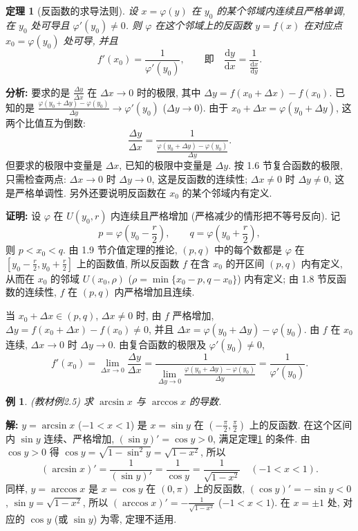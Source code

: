 \documentclass[UTF8,openany]{ctexbook}
\theoremstyle{chinesetextbook}
\newtheorem{example}{例}[section]
\newtheorem{theorem}{定理}[section]
\newenvironment{cnproof}{\par\indent\textbf{证明:} \ignorespaces}{\par}
\newenvironment{cnsolution}{\par\indent\textbf{解:} \ignorespaces}{\par}
\newcommand{\dd}{\mathrm d}
\begin{document}
\begin{theorem}[反函数的求导法则]\label{thm:c2-2-inv}
设 $x=\varphi(y)$ 在 $y_0$ 的某个邻域内连续且严格单调, 在 $y_0$ 处可导且 $\varphi'(y_0)\ne0$. 则 $\varphi$ 在这个邻域上的反函数 $y=f(x)$ 在对应点 $x_0=\varphi(y_0)$ 处可导, 并且
\[
f'(x_0)=\frac1{\varphi'(y_0)},\qquad\text{即}\quad\frac{\dd y}{\dd x}=\frac1{\displaystyle\frac{\dd x}{\dd y}}.
\]
\end{theorem}
\par\indent\textbf{分析:} 要求的是 $\displaystyle\frac{\Delta y}{\Delta x}$ 在 $\Delta x\to0$ 时的极限, 其中 $\Delta y=f(x_0+\Delta x)-f(x_0)$. 已知的是 $\displaystyle\frac{\varphi(y_0+\Delta y)-\varphi(y_0)}{\Delta y}\to\varphi'(y_0)$ ($\Delta y\to0$). 由于 $x_0+\Delta x=\varphi(y_0+\Delta y)$, 这两个比值互为倒数:
\[
\frac{\Delta y}{\Delta x}=\frac1{\displaystyle\frac{\varphi(y_0+\Delta y)-\varphi(y_0)}{\Delta y}}.
\]
但要求的极限中变量是 $\Delta x$, 已知的极限中变量是 $\Delta y$. 按 1.6 节复合函数的极限, 只需检查两点: $\Delta x\to0$ 时 $\Delta y\to0$, 这是反函数的连续性; $\Delta x\ne0$ 时 $\Delta y\ne0$, 这是严格单调性. 另外还要说明反函数在 $x_0$ 的某个邻域内有定义.
\begin{cnproof}
设 $\varphi$ 在 $U(y_0,r)$ 内连续且严格增加 (严格减少的情形把不等号反向). 记
\[
p=\varphi\left(y_0-\frac r2\right),\qquad q=\varphi\left(y_0+\frac r2\right),
\]
则 $p<x_0<q$. 由 1.9 节介值定理的推论, $(p,q)$ 中的每个数都是 $\varphi$ 在 $\displaystyle\left[y_0-\frac r2,y_0+\frac r2\right]$ 上的函数值, 所以反函数 $f$ 在含 $x_0$ 的开区间 $(p,q)$ 内有定义, 从而在 $x_0$ 的邻域 $U(x_0,\rho)$ ($\rho=\min\{x_0-p,q-x_0\}$) 内有定义; 由 1.8 节反函数的连续性, $f$ 在 $(p,q)$ 内严格增加且连续.

当 $x_0+\Delta x\in(p,q)$, $\Delta x\ne0$ 时, 由 $f$ 严格增加, $\Delta y=f(x_0+\Delta x)-f(x_0)\ne0$, 并且 $\Delta x=\varphi(y_0+\Delta y)-\varphi(y_0)$. 由 $f$ 在 $x_0$ 连续, $\Delta x\to0$ 时 $\Delta y\to0$. 由复合函数的极限及 $\varphi'(y_0)\ne0$,
\[
f'(x_0)=\lim_{\Delta x\to0}\frac{\Delta y}{\Delta x}=\frac1{\displaystyle\lim_{\Delta y\to0}\frac{\varphi(y_0+\Delta y)-\varphi(y_0)}{\Delta y}}=\frac1{\varphi'(y_0)}.
\]
\end{cnproof}
\begin{example}\label{ex:c2-2-5}
\textnormal{(教材例2.5)} 求 $\arcsin x$ 与 $\arccos x$ 的导数.
\end{example}
\begin{cnsolution}
$y=\arcsin x$ ($-1<x<1$) 是 $x=\sin y$ 在 $\displaystyle\left(-\frac\pi2,\frac\pi2\right)$ 上的反函数. 在这个区间内 $\sin y$ 连续、严格增加, $(\sin y)'=\cos y>0$, 满足定理\ref{thm:c2-2-inv} 的条件. 由 $\cos y>0$ 得 $\cos y=\sqrt{1-\sin^2y}=\sqrt{1-x^2}$, 所以
\[
(\arcsin x)'=\frac1{(\sin y)'}=\frac1{\cos y}=\frac1{\sqrt{1-x^2}}\quad(-1<x<1).
\]
同样, $y=\arccos x$ 是 $x=\cos y$ 在 $(0,\pi)$ 上的反函数, $(\cos y)'=-\sin y<0$, $\sin y=\sqrt{1-x^2}$, 所以 $\displaystyle(\arccos x)'=-\frac1{\sqrt{1-x^2}}$ ($-1<x<1$). 在 $x=\pm1$ 处, 对应的 $\cos y$ (或 $\sin y$) 为零, 定理不适用.
\end{cnsolution}
\end{document}
